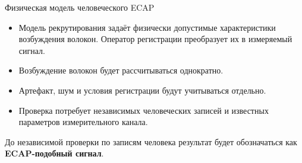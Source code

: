 \begin{frame}{Физическая модель человеческого ECAP}
\centering
{}
\SlideGap
\raggedright
\begin{itemize}
\item Модель рекрутирования задаёт физически допустимые характеристики возбуждения волокон. Оператор регистрации преобразует их в измеряемый сигнал.
\item Возбуждение волокон будет рассчитываться однократно.
\item Артефакт, шум и условия регистрации будут учитываться отдельно.
\item Проверка потребует независимых человеческих записей и известных параметров измерительного канала.
\end{itemize}
До независимой проверки по записям человека результат будет обозначаться как \textbf{ECAP-подобный сигнал}.
\end{frame}
